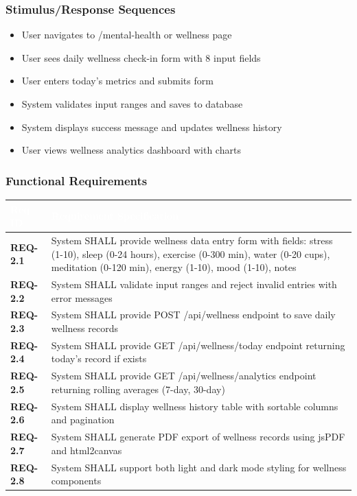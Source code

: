\documentclass[12pt,a4paper]{article}
\begin{document}
\subsubsection{Stimulus/Response Sequences}
\begin{itemize}
    \item User navigates to /mental-health or wellness page
    \item User sees daily wellness check-in form with 8 input fields
    \item User enters today's metrics and submits form
    \item System validates input ranges and saves to database
    \item System displays success message and updates wellness history
    \item User views wellness analytics dashboard with charts
\end{itemize}

\subsubsection{Functional Requirements}

\vspace{0.3em}
\begin{center}
\begin{tabular}{|l|p{11cm}|}
\hline
\rowcolor{deepblue}
\textcolor{white}{\textbf{Req ID}} & \textcolor{white}{\textbf{Requirement Specification}} \\
\hline
\rowcolor{lightgray}
\textbf{REQ-2.1} & System SHALL provide wellness data entry form with fields: stress (1-10), sleep (0-24 hours), exercise (0-300 min), water (0-20 cups), meditation (0-120 min), energy (1-10), mood (1-10), notes \\
\hline
\textbf{REQ-2.2} & System SHALL validate input ranges and reject invalid entries with error messages \\
\hline
\rowcolor{lightgray}
\textbf{REQ-2.3} & System SHALL provide POST /api/wellness endpoint to save daily wellness records \\
\hline
\textbf{REQ-2.4} & System SHALL provide GET /api/wellness/today endpoint returning today's record if exists \\
\hline
\rowcolor{lightgray}
\textbf{REQ-2.5} & System SHALL provide GET /api/wellness/analytics endpoint returning rolling averages (7-day, 30-day) \\
\hline
\textbf{REQ-2.6} & System SHALL display wellness history table with sortable columns and pagination \\
\hline
\rowcolor{lightgray}
\textbf{REQ-2.7} & System SHALL generate PDF export of wellness records using jsPDF and html2canvas \\
\hline
\textbf{REQ-2.8} & System SHALL support both light and dark mode styling for wellness components \\
\hline
\end{tabular}
\end{center}
\end{document}
